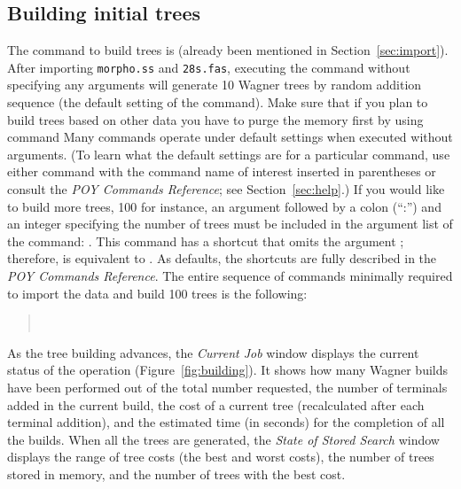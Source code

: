 \subsection{Building initial trees}

The command to build trees is  (already been mentioned in Section~\ref{sec:import}). After importing \texttt{morpho.ss} and \texttt{28s.fas}, executing the command  without specifying any arguments will generate 10 Wagner trees by random addition sequence (the default setting of the command). Make sure that if you plan to build trees based on other data you have to purge the memory first by using  command
Many \poy commands operate under default settings when executed without arguments. (To learn what the default settings are for a particular command, use either  command with the command name of interest inserted in parentheses or consult the \emph{POY Commands Reference}; see Section~\ref{sec:help}.) If you would like to build more trees, 100 for instance, an argument  followed by a colon (``:'') and an integer specifying the number of trees must be included in the argument list of the  command: . This command has a shortcut that omits the argument ; therefore,  is equivalent to . As defaults, the shortcuts are fully described in the \emph{POY Commands Reference}. The entire sequence of commands minimally required to import the data and build 100 trees is the following:

\begin{quote}
 	\\
\end{quote}

As the tree building advances, the \emph{Current Job} window displays the current status of the operation (Figure~\ref{fig:building}). It shows how many Wagner builds have been performed out of the total number requested, the number of terminals added in the current build, the cost of a current tree (recalculated after each terminal addition), and the estimated time (in seconds) for the completion of all the builds. When all the trees are generated, the \emph{State of Stored Search} window displays the range of tree costs (the best and worst costs), the number of trees stored in memory, and the number of trees with the best cost.

